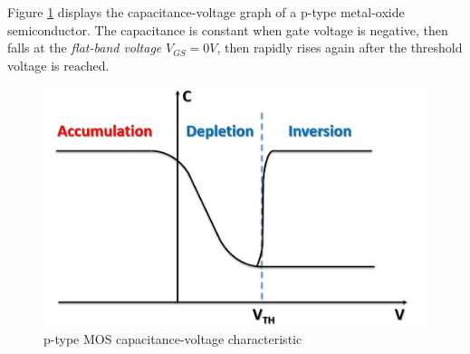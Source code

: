 \documentclass[nobib]{tufte-handout}
\begin{document}
Figure \ref{fig:p-type MOS C-V} displays the 
capacitance-voltage graph of a p-type metal-oxide 
semiconductor. The capacitance is constant when 
gate voltage is negative, then falls at the \emph{flat-band voltage}
$V_{GS} = 0V$, then rapidly rises again after the threshold voltage 
is reached. 
\begin{figure}
    \caption{p-type MOS capacitance-voltage characteristic}
    \label{fig:p-type MOS C-V}
    \includegraphics{moscv.png}
\end{figure}
\end{document}

